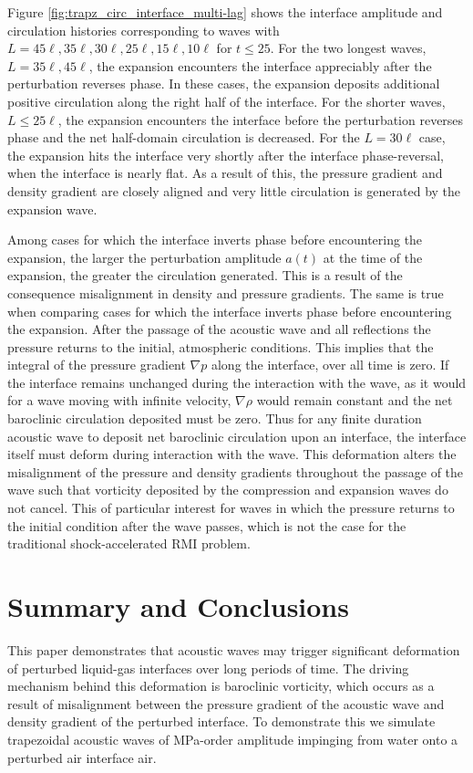 Figure \ref{fig:trapz_circ_interface_multi-lag} shows the interface
amplitude and circulation histories corresponding to waves with
$L=45\ell, 35\ell ,30\ell ,25\ell ,15\ell ,10\ell$ for $t\leq 25$.
For the two longest waves, $L=35\ell, 45\ell$, the expansion
encounters the interface appreciably after the perturbation reverses
phase. In these cases, the expansion deposits additional positive
circulation along the right half of the interface. For the shorter
waves, $L \leq 25\ell$, the expansion encounters the interface before
the perturbation reverses phase and the net half-domain circulation is
decreased. For the $L=30\ell$ case, the expansion hits the interface
very shortly after the interface phase-reversal, when the interface is
nearly flat. As a result of this, the pressure gradient and density
gradient are closely aligned and very little circulation is generated
by the expansion wave.

Among cases for which the interface inverts phase before encountering
the expansion, the larger the perturbation amplitude $a(t)$ at the
time of the expansion, the greater the circulation generated. This is
a result of the consequence misalignment in density and pressure
gradients. The same is true when comparing cases for which the
interface inverts phase before encountering the expansion. After the
passage of the acoustic wave and all reflections the pressure returns
to the initial, atmospheric conditions. This implies that the integral
of the pressure gradient $\nabla p$ along the interface, over all time
is zero. If the interface remains unchanged during the interaction
with the wave, as it would for a wave moving with infinite velocity,
$\nabla \rho$ would remain constant and the net baroclinic circulation
deposited must be zero. Thus for any finite duration acoustic wave to
deposit net baroclinic circulation upon an interface, the interface
itself must deform during interaction with the wave. This deformation
alters the misalignment of the pressure and density gradients
throughout the passage of the wave such that vorticity deposited by
the compression and expansion waves do not cancel. This of particular
interest for waves in which the pressure returns to the initial
condition after the wave passes, which is not the case for the
traditional shock-accelerated \ac{RMI} problem.

\section{Summary and Conclusions}
\label{sec:conclusions}
This paper demonstrates that acoustic waves may trigger significant
deformation of perturbed liquid-gas interfaces over long periods of
time. The driving mechanism behind this deformation is baroclinic
vorticity, which occurs as a result of misalignment between the
pressure gradient of the acoustic wave and density gradient of the
perturbed interface. To demonstrate this we simulate trapezoidal
acoustic waves of MPa-order amplitude impinging from water onto a
perturbed air interface air.

